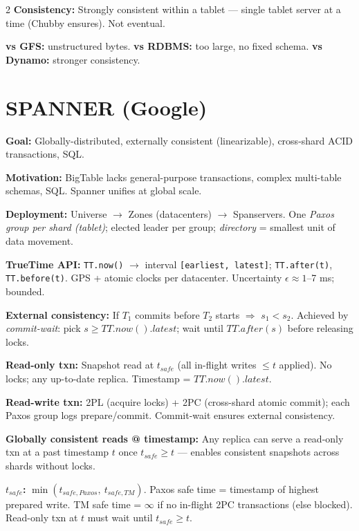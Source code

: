 \documentclass[9pt]{article}
\begin{document}
\begin{multicols*}{2}
\textbf{Consistency:} Strongly consistent within a tablet — single tablet server at a time (Chubby ensures). Not eventual.

\textbf{vs GFS:} unstructured bytes. \textbf{vs RDBMS:} too large, no fixed schema. \textbf{vs Dynamo:} stronger consistency.

\section*{SPANNER (Google)}

\textbf{Goal:} Globally-distributed, externally consistent (linearizable), cross-shard ACID transactions, SQL.

\textbf{Motivation:} BigTable lacks general-purpose transactions, complex multi-table schemas, SQL. Spanner unifies at global scale.

\textbf{Deployment:} Universe $\to$ Zones (datacenters) $\to$ Spanservers. One \emph{Paxos group per shard (tablet)}; elected leader per group; \emph{directory} = smallest unit of data movement.

\textbf{TrueTime API:} \texttt{TT.now()} $\to$ interval \texttt{[earliest, latest]}; \texttt{TT.after(t)}, \texttt{TT.before(t)}. GPS + atomic clocks per datacenter. Uncertainty $\epsilon \approx 1$--7 ms; bounded.

\textbf{External consistency:} If $T_1$ commits before $T_2$ starts $\Rightarrow$ $s_1 < s_2$. Achieved by \emph{commit-wait}: pick $s \ge TT.now().latest$; wait until $TT.after(s)$ before releasing locks.

\textbf{Read-only txn:} Snapshot read at $t_{safe}$ (all in-flight writes $\le t$ applied). No locks; any up-to-date replica. Timestamp = $TT.now().latest$.

\textbf{Read-write txn:} 2PL (acquire locks) + 2PC (cross-shard atomic commit); each Paxos group logs prepare/commit. Commit-wait ensures external consistency.

\textbf{Globally consistent reads @ timestamp:} Any replica can serve a read-only txn at a past timestamp $t$ once $t_{safe} \ge t$ — enables consistent snapshots across shards without locks.

\textbf{$t_{safe}$:} $\min(t_{safe,Paxos},\ t_{safe,TM})$. Paxos safe time = timestamp of highest prepared write. TM safe time = $\infty$ if no in-flight 2PC transactions (else blocked). Read-only txn at $t$ must wait until $t_{safe} \ge t$.


\end{multicols*}
\end{document}
